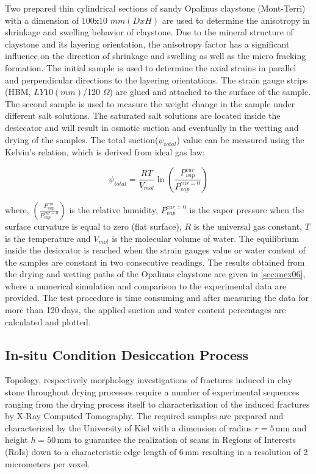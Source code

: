Two prepared thin cylindrical sections of sandy Opalinus claystone (Mont-Terri) with a dimension of 100x10 $mm (DxH)$ are used to determine the anisotropy in shrinkage and swelling behavior of claystone. Due to the mineral structure of claystone and its layering orientation, the anisotropy factor has a significant influence on the direction of shrinkage and swelling as well as the micro fracking formation. The initial sample is used to determine the axial strains in parallel and perpendicular directions to the layering orientations. The strain gauge strips (HBM, $LY 10 (mm)$/120 $\Omega$) are glued and attached to the surface of the sample. The second sample is used to measure the weight change in the sample under different salt solutions. The saturated salt solutions are located inside the desiccator and will result in osmotic suction and eventually in the wetting and drying of the samples. The total suction($\psi_{total}$) value can be measured using the Kelvin’s relation, which is derived from ideal gas law:

\begin{equation}
\label{eq:Total_Suction}
\psi_{total} = \frac{RT}{V_{mol}} \ln(\frac{P_{vap}^{cur}}{P_{vap}^{cur=0}})
\end{equation}

where, $(\frac{P_{vap}^{cur}}{P_{vap}^{cur=0}})$ is the relative humidity, $P_{vap}^{cur=0}$ is the vapor pressure when the surface curvature is equal to zero (flat surface), $R$ is the universal gas constant, $T$ is the temperature and $V_{mol}$ is the molecular volume of water. The equilibrium inside the desiccator is reached when the strain gauges value or water content of the samples are constant in two consecutive readings. The results obtained from the drying and wetting paths of the Opalinus claystone are given in \ref{sec:mex06}, where a numerical simulation and comparison to the experimental data are provided. The test procedure is time consuming and after measuring the data for more than 120 days, the applied suction and water content percentages are calculated and plotted. 

\subsection{In-situ Condition Desiccation Process}

Topology, respectively morphology investigations of fractures induced in clay stone throughout drying processes require a number of experimental sequences ranging from the drying process itself to characterization of the induced fractures by X-Ray Computed Tomography. The required samples are prepared and characterized by the University of Kiel with a dimension of radius $r = 5 \, \text{mm}$ and height $h = 50 \, \text{mm}$ to guarantee the realization of scans in Regions of Interests (RoIs) down to a characteristic edge length of $6 \, \text{mm}$ resulting in a resolution of 2 micrometers per voxel.

